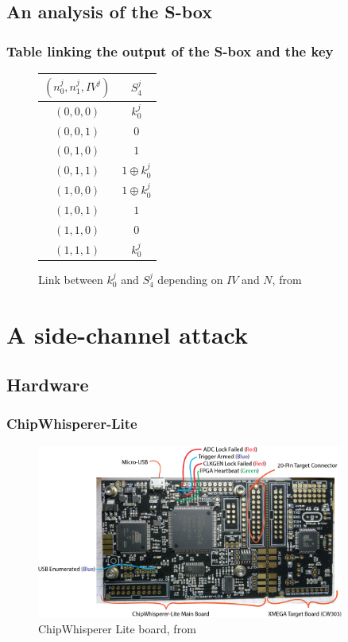 \documentclass{beamer}
\begin{document}
	\subsection{An analysis of the S-box}
	\begin{frame}
		\frametitle{Table linking the output of the S-box and the key}
		\begin{figure}[h]
			\centering
			\begin{tabular}{|c|c|}
				\hline
				$(n_0^j,n_1^j,IV^j)$&$S_4^j$\\
				\hline\hline
				$(0,0,0)$&$k_0^j$\\
				\hline
				$(0,0,1)$&$0$\\
				\hline
				$(0,1,0)$&$1$\\
				\hline
				$(0,1,1)$&$1 \oplus k_0^j$\\
				\hline
				$(1,0,0)$&$1 \oplus k_0^j$\\
				\hline
				$(1,0,1)$&$1$\\
				\hline
				$(1,1,0)$&$0$\\
				\hline
				$(1,1,1)$&$k_0^j$\\
				\hline
			\end{tabular}
			\caption{Link between $k_0^j$ and $S_4^j$ depending on $IV$ and $N$, from \cite{these}}
			\label{link_k_s4}
		\end{figure}
	\end{frame}
	
	\section{A side-channel attack}
	\subsection{Hardware}
	\begin{frame}
		\frametitle{ChipWhisperer-Lite}
		\begin{figure}[h]
			\raggedright
			\includegraphics[width=0.9\textwidth]{img_files/cwlite_basic1}
			\caption{ChipWhisperer Lite board, from \cite{cwdoc}}
			\label{fig:cw}
		\end{figure}
	\end{frame}
	
\end{document}
